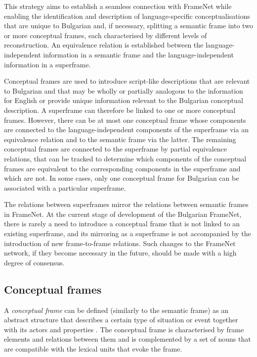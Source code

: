 \documentclass[output=paper,colorlinks,citecolor=brown]{langscibook}
\begin{document}
This strategy aims to establish a seamless connection with FrameNet while enabling the identification and description of language-specific conceptualisations that are unique to Bulgarian and, if necessary, splitting a semantic frame into two or more conceptual frames, each characterised by different levels of reconstruction. An equivalence relation is established between the language-independent information in a semantic frame and the language-independent information in a superframe.

Conceptual frames are used to introduce script-like descriptions that are relevant to Bulgarian and that may be wholly or partially analogous to the information for English or provide unique information relevant to the Bulgarian conceptual description. A superframe can therefore be linked to one or more conceptual frames. However, there can be at most one conceptual frame whose components are connected to the language-independent components of the superframe via an equivalence relation and to the semantic frame via the latter. The remaining conceptual frames are connected to the superframe by partial equivalence relations, that can be tracked to determine which components of the conceptual frames are equivalent to the corresponding components in the superframe and which are not. In some cases, only one conceptual frame for Bulgarian can be associated with a particular superframe.

The relations between superframes mirror the relations between semantic frames in FrameNet. At the current stage of development of the Bulgarian FrameNet, there is rarely a need to introduce a conceptual frame that is not linked to an existing superframe, and its mirroring as a superframe is not accompanied by the introduction of new frame-to-frame  relations. Such changes to the FrameNet network, if they become necessary in the future, should be made with a high degree of consensus.

\subsection{Conceptual frames}  
A \emph{conceptual frame} can be defined (similarly to the semantic frame) as an abstract structure that describes a certain type of situation or event together with its actors and properties \citep[7]{koeva2020}. The conceptual frame is characterised by frame elements and relations between them and is complemented by a set of nouns that are compatible with the lexical units that evoke the frame. 
\end{document}
